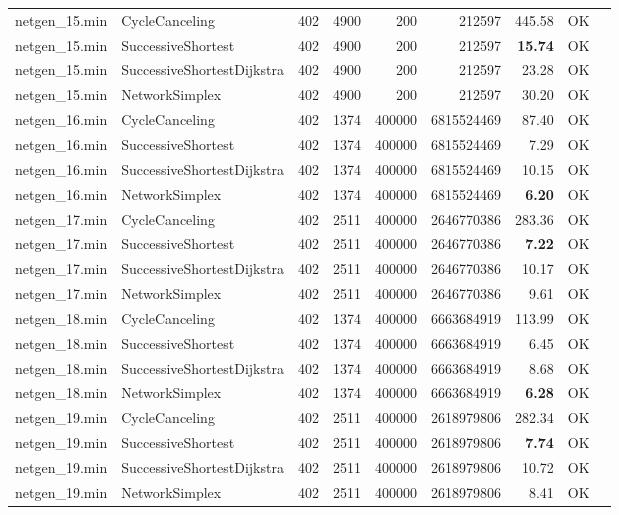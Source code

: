 \begin{longtable}{llrrrrrrl}
\midrule
netgen\_15.min & CycleCanceling & 402 & 4900 & 200 & 212597 & 445.58 & OK \\
netgen\_15.min & SuccessiveShortest & 402 & 4900 & 200 & 212597 & \textbf{15.74} & OK \\
netgen\_15.min & SuccessiveShortestDijkstra & 402 & 4900 & 200 & 212597 & 23.28 & OK \\
netgen\_15.min & NetworkSimplex & 402 & 4900 & 200 & 212597 & 30.20 & OK \\
\midrule
netgen\_16.min & CycleCanceling & 402 & 1374 & 400000 & 6815524469 & 87.40 & OK \\
netgen\_16.min & SuccessiveShortest & 402 & 1374 & 400000 & 6815524469 & 7.29 & OK \\
netgen\_16.min & SuccessiveShortestDijkstra & 402 & 1374 & 400000 & 6815524469 & 10.15 & OK \\
netgen\_16.min & NetworkSimplex & 402 & 1374 & 400000 & 6815524469 & \textbf{6.20} & OK \\
\midrule
netgen\_17.min & CycleCanceling & 402 & 2511 & 400000 & 2646770386 & 283.36 & OK \\
netgen\_17.min & SuccessiveShortest & 402 & 2511 & 400000 & 2646770386 & \textbf{7.22} & OK \\
netgen\_17.min & SuccessiveShortestDijkstra & 402 & 2511 & 400000 & 2646770386 & 10.17 & OK \\
netgen\_17.min & NetworkSimplex & 402 & 2511 & 400000 & 2646770386 & 9.61 & OK \\
\midrule
netgen\_18.min & CycleCanceling & 402 & 1374 & 400000 & 6663684919 & 113.99 & OK \\
netgen\_18.min & SuccessiveShortest & 402 & 1374 & 400000 & 6663684919 & 6.45 & OK \\
netgen\_18.min & SuccessiveShortestDijkstra & 402 & 1374 & 400000 & 6663684919 & 8.68 & OK \\
netgen\_18.min & NetworkSimplex & 402 & 1374 & 400000 & 6663684919 & \textbf{6.28} & OK \\
\midrule
netgen\_19.min & CycleCanceling & 402 & 2511 & 400000 & 2618979806 & 282.34 & OK \\
netgen\_19.min & SuccessiveShortest & 402 & 2511 & 400000 & 2618979806 & \textbf{7.74} & OK \\
netgen\_19.min & SuccessiveShortestDijkstra & 402 & 2511 & 400000 & 2618979806 & 10.72 & OK \\
netgen\_19.min & NetworkSimplex & 402 & 2511 & 400000 & 2618979806 & 8.41 & OK \\
\midrule

\end{longtable}
